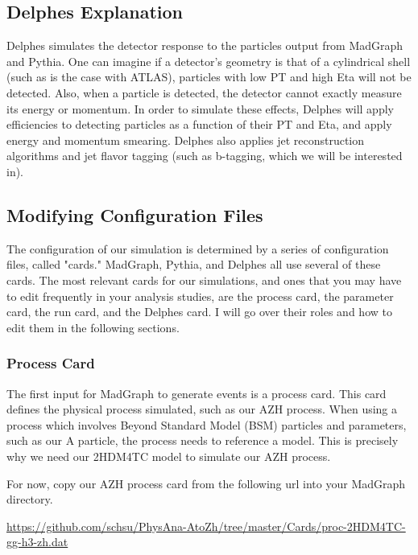 \documentclass{article}
\begin{document}
\subsection{Delphes Explanation}

Delphes simulates the detector response to the particles output from MadGraph and Pythia. One can imagine if a detector's 
geometry is that of a cylindrical shell (such as is the case with ATLAS), particles
with low PT and high Eta will not be detected. Also, when a particle is detected, the detector cannot exactly measure its
energy or momentum. In order to simulate these effects, Delphes will apply efficiencies to detecting particles as a function
of their PT and Eta, and apply energy and momentum smearing. Delphes also applies jet reconstruction algorithms and jet flavor
tagging (such as b-tagging, which we will be interested in).

\subsection{Modifying Configuration Files}

The configuration of our simulation is determined by a series of configuration
files, called "cards." MadGraph, Pythia, and Delphes all use several of these cards.
The most relevant cards for our simulations, and ones that you may have to edit frequently
in your analysis studies, are the process card, the parameter card, the run card, and the
Delphes card. I will go over their roles and how to edit them in the following sections.

\subsubsection{Process Card}

The first input for MadGraph to generate events is a process card. This card defines the
physical process simulated, such as our AZH process. When using a process which involves
Beyond Standard Model (BSM) particles and parameters, such as our A particle, the process
needs to reference a model. This is precisely why we need our 2HDM4TC model to simulate our AZH process.

\bigskip

For now, copy our AZH process card from the following url into your MadGraph directory.

\bigskip

\url{https://github.com/schsu/PhysAna-AtoZh/tree/master/Cards/proc-2HDM4TC-gg-h3-zh.dat}
\end{document}
